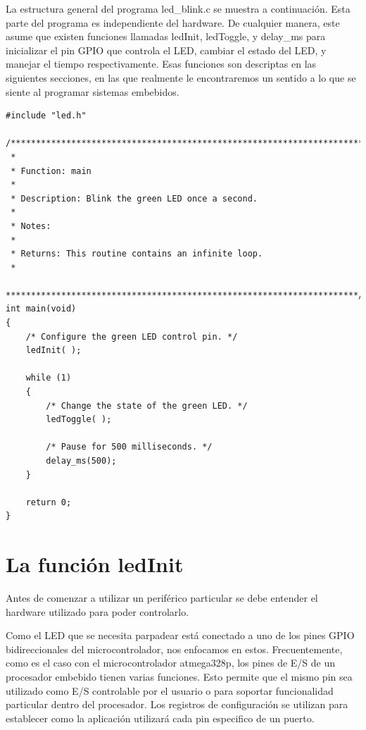 \documentclass[12pt]{article}
\begin{document}
La estructura general del programa led\_blink.c se muestra a continuación.
Esta parte del programa es independiente del hardware. De cualquier manera,
este asume que existen funciones llamadas ledInit, ledToggle, y delay\_ms
para inicializar el pin GPIO que controla el LED, cambiar el estado del LED,
y manejar el tiempo respectivamente. Esas funciones son descriptas en las 
siguientes secciones, en las que realmente le encontraremos un
sentido a lo que se siente al programar sistemas embebidos.

\begin{verbatim}
#include "led.h"

/**********************************************************************
 *
 * Function: main
 *
 * Description: Blink the green LED once a second.
 *
 * Notes:
 *
 * Returns: This routine contains an infinite loop.
 *
 **********************************************************************/
int main(void)
{
    /* Configure the green LED control pin. */
    ledInit( );

    while (1)
    {
        /* Change the state of the green LED. */
        ledToggle( );

        /* Pause for 500 milliseconds. */
        delay_ms(500);
    }

    return 0;
}
\end{verbatim}

\section *{La función ledInit}

Antes de comenzar a utilizar un periférico particular se debe entender el 
hardware utilizado para poder controlarlo.


Como el LED que se necesita parpadear está conectado a uno de los pines
GPIO bidireccionales del microcontrolador, nos enfocamos en estos.
Frecuentemente, como es el caso con el microcontrolador atmega328p, los
pines de E/S de un procesador embebido tienen varias funciones.
Esto permite que el mismo pin sea utilizado como E/S controlable por el usuario
o para soportar funcionalidad particular dentro del procesador.
Los registros de configuración se utilizan para establecer como la aplicación
utilizará cada pin especifico de un puerto.
\end{document}
